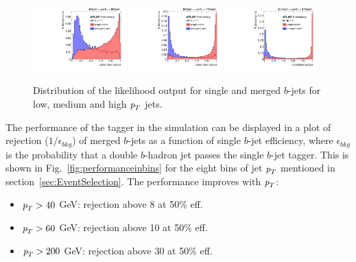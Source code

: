 \begin{figure}[tp]
\centering
\includegraphics[width=0.32\textwidth,viewport=40 0 540 550]{FIGS/Likelihood/NNoutput040_LihoodKDE.pdf}
\includegraphics[width=0.32\textwidth,viewport=40 0 540 550,clip]{FIGS/Likelihood/NNoutput080_LihoodKDE.pdf}
\includegraphics[width=0.32\textwidth,viewport=40 0 540 550,clip]{FIGS/Likelihood/NNoutput200_LihoodKDE.pdf}  
\caption{Distribution of the likelihood output for single and merged $b$-jets for low, medium and high ${\emph{p}_{T}}$ jets.}
\label{fig:outputinbins}
\end{figure}

The performance of the tagger in the simulation can be 
displayed in a plot of rejection ($1/\epsilon_{bkg}$) of merged $b$-jets as a function of single $b$-jet efficiency, where $\epsilon_{bkg}$ is the probability that a double $b$-hadron jet passes the single $b$-jet tagger. This is shown in Fig.~\ref{fig:performanceinbins} for the eight bins of jet ${\emph{p}_{T}}$ mentioned in section~\ref{sec:EventSelection}. The performance improves with ${\emph{p}_{T}}$:


\begin{itemize}\addtolength{\itemsep}{-0.4\baselineskip}
\item
${\emph{p}_{T}}>40$ GeV: %
rejection above 8 at 50\% eff.
\item
${\emph{p}_{T}}>60$ GeV: %
rejection above 10 at 50\% eff.
\item
${\emph{p}_{T}}>200$ GeV: %
rejection above 30 at 50\% eff.
\end{itemize}


